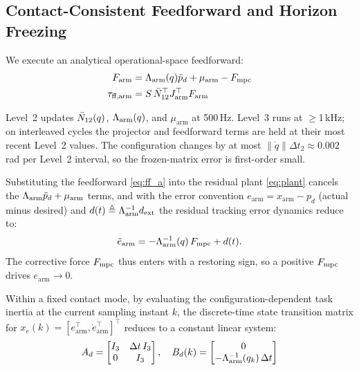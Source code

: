 \subsection{Contact-Consistent Feedforward and Horizon Freezing}

We execute an analytical operational-space feedforward:
\begin{subequations}\label{eq:feedforward}
\begin{align}
  F_{\text{arm}} &= \Lambda_{\text{arm}}(q)\ddot{p}_d + \mu_{\text{arm}} - F_{\text{mpc}} \label{eq:ff_a}\\
  \tau_{\text{ff,arm}} &= S\,\bar{N}_{12}^\top J_{\text{arm}}^\top F_{\text{arm}} \label{eq:ff_b}
\end{align}
\end{subequations}

Level~2 updates $\bar{N}_{12}(q)$, $\Lambda_{\text{arm}}(q)$, and $\mu_{\text{arm}}$ at 500\,Hz.
Level~3 runs at $\geq$1\,kHz; on interleaved cycles the projector and
feedforward terms are held at their most recent Level~2 values.
The configuration changes by at most $\|\dot{q}\|\Delta t_2\approx0.002$\,rad
per Level~2 interval, so the frozen-matrix error is first-order small.

Substituting the feedforward \eqref{eq:ff_a} into the residual plant
\eqref{eq:plant} cancels the $\Lambda_{\text{arm}}\ddot p_d+\mu_{\text{arm}}$ terms, and with
the error convention $e_{\text{arm}}=x_{\text{arm}}-p_d$ (actual minus
desired) and $d(t)\triangleq\Lambda_{\text{arm}}^{-1}d_{\text{ext}}$ the residual tracking
error dynamics reduce to:
\begin{equation}\label{eq:errordyn}
  \ddot{e}_{\text{arm}} = -\Lambda_{\text{arm}}^{-1}(q)\,F_{\text{mpc}} + d(t).
\end{equation}
The corrective force $F_{\text{mpc}}$ thus enters with a restoring sign, so a positive
$F_{\text{mpc}}$ drives $e_{\text{arm}}\to0$.

\begin{proposition}
\label{prop:constant_Ad}
Within a fixed contact mode, by evaluating the configuration-dependent task
inertia at the current sampling instant $k$, the discrete-time state
transition matrix for $x_e(k)=[e_{\text{arm}}^\top,\dot{e}_{\text{arm}}^\top]^\top$
reduces to a constant linear system:
\begin{equation}\label{eq:Ad}
  A_d = \begin{bmatrix}I_3 & \Delta t\,I_3 \\ 0 & I_3\end{bmatrix},
  \quad
  B_d(k) = \begin{bmatrix}0 \\ -\Lambda_{\text{arm}}^{-1}(q_k)\,\Delta t\end{bmatrix}
\end{equation}
\end{proposition}

